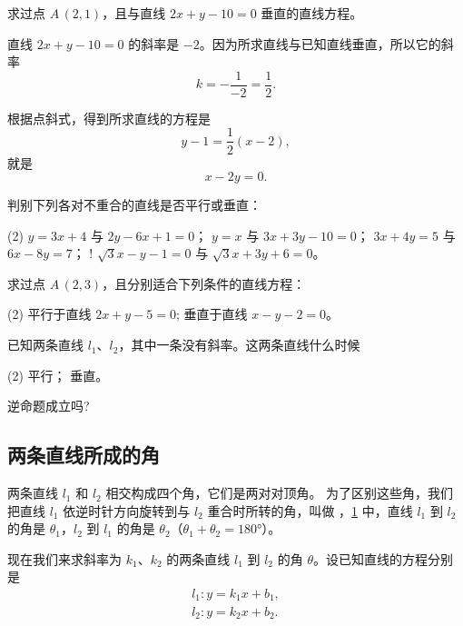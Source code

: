 \begin{example}
求过点 $A\,(2,1)$，且与直线 $2x+y-10=0$ 垂直的直线方程。
\end{example}

\begin{solution}
  直线 $2x+y-10=0$ 的斜率是 $-2$。因为所求直线与已知直线垂直，所以它的斜率
  \[ k= -\frac{1}{-2}=\frac{1}{2}.\]

  根据点斜式，得到所求直线的方程是
\[ y-1=\frac{1}{2}(x-2), \]
就是
\[ x-2y= 0. \]
\end{solution}

\begin{Practice}
  \begin{question}
    \item 判别下列各对不重合的直线是否平行或垂直：
    \begin{tasks}(2)
      \task $y=3x+4$ 与 $2y-6x+1=0$；
      \task $y=x$ 与 $3x+3y-10=0$；
      \task $3x+4y=5$ 与 $6x-8y=7$；
      \task! $\sqrt{3}x-y-1=0$ 与 $\sqrt{3}x+3y+6=0$。
    \end{tasks}
    \item 求过点 $A\,(2,3)$，且分别适合下列条件的直线方程：
    \begin{tasks}(2)
      \task 平行于直线 $2x+y-5=0$;
      \task 垂直于直线 $x-y-2=0$。
    \end{tasks}
    \item 已知两条直线 $l_1$、$l_2$，其中一条没有斜率。这两条直线什么时候
    \begin{tasks}(2)
      \task 平行；
      \task 垂直。
    \end{tasks}
    逆命题成立吗?
  \end{question}
\end{Practice}

\subsection{两条直线所成的角}
两条直线 $l_1$ 和 $l_2$ 相交构成四个角，它们是两对对顶角。
为了区别这些角，我们把直线 $l_1$ 依逆时针方向旋转到与 $l_2$ 重合时所转的角，叫做 ，\cref{fig:1-31} 中，直线 $l_1$ 到 $l_2$ 的角是 $\theta_1$，$l_2$ 到 $l_1$ 的角是 $\theta_2$（$\theta_1+\theta_2=\ang{180}$）。
\begin{figure}
  \caption{}\label{fig:1-31}
\end{figure}

现在我们来求斜率为 $k_1$、$k_2$ 的两条直线 $l_1$ 到 $l_2$ 的角 $\theta$。设已知直线的方程分别是
\begin{gather*}
  l_1: y=k_1x+b_1,\\
  l_2: y=k_2x+b_2.
\end{gather*}

